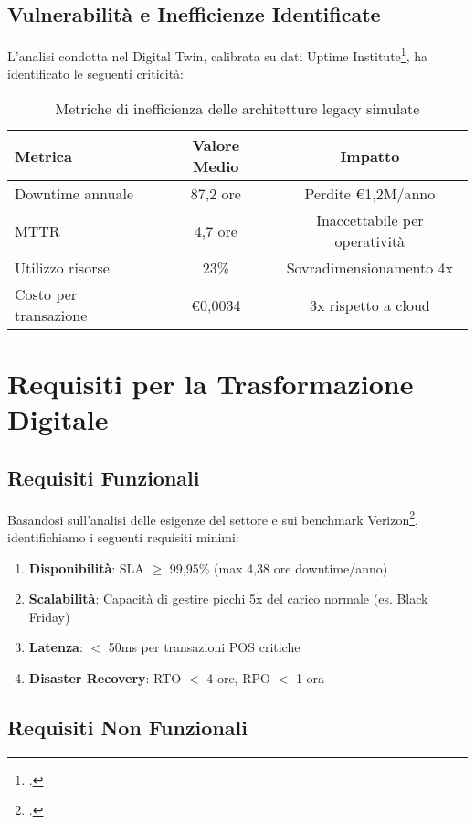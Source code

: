 \subsection{Vulnerabilità e Inefficienze Identificate}

L'analisi condotta nel Digital Twin, calibrata su dati Uptime Institute\footcite{Uptime2024}, ha identificato le seguenti criticità:

\begin{table}[h!]
\centering
\caption{Metriche di inefficienza delle architetture legacy simulate}
\begin{tabular}{|l|c|c|}
\hline
\textbf{Metrica} & \textbf{Valore Medio} & \textbf{Impatto} \\
\hline
Downtime annuale & 87,2 ore & Perdite €1,2M/anno \\
MTTR & 4,7 ore & Inaccettabile per operatività \\
Utilizzo risorse & 23\% & Sovradimensionamento 4x \\
Costo per transazione & €0,0034 & 3x rispetto a cloud \\
\hline
\end{tabular}
\end{table}

\section{Requisiti per la Trasformazione Digitale}

\subsection{Requisiti Funzionali}

Basandosi sull'analisi delle esigenze del settore e sui benchmark Verizon\footcite{verizon2024}, identifichiamo i seguenti requisiti minimi:

\begin{enumerate}
\item \textbf{Disponibilità}: SLA $\geq$ 99,95\% (max 4,38 ore downtime/anno)
\item \textbf{Scalabilità}: Capacità di gestire picchi 5x del carico normale (es. Black Friday)
\item \textbf{Latenza}: $<$ 50ms per transazioni POS critiche
\item \textbf{Disaster Recovery}: RTO $<$ 4 ore, RPO $<$ 1 ora
\end{enumerate}

\subsection{Requisiti Non Funzionali}

